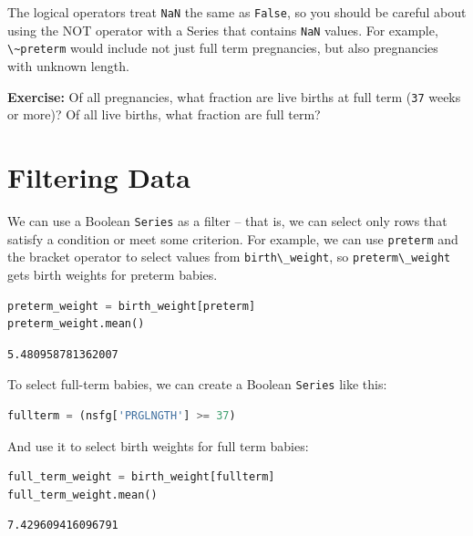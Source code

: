 The logical operators treat \passthrough{\lstinline!NaN!} the same as
\passthrough{\lstinline!False!}, so you should be careful about using
the NOT operator with a Series that contains
\passthrough{\lstinline!NaN!} values. For example,
\passthrough{\lstinline!\~preterm!} would include not just full term
pregnancies, but also pregnancies with unknown length.

\textbf{Exercise:} Of all pregnancies, what fraction are live births at
full term (\passthrough{\lstinline!37!} weeks or more)? Of all live
births, what fraction are full term?

\hypertarget{filtering-data}{%
\section{Filtering Data}\label{filtering-data}}

We can use a Boolean \passthrough{\lstinline!Series!} as a filter --
that is, we can select only rows that satisfy a condition or meet some
criterion. For example, we can use \passthrough{\lstinline!preterm!} and
the bracket operator to select values from
\passthrough{\lstinline!birth\_weight!}, so
\passthrough{\lstinline!preterm\_weight!} gets birth weights for preterm
babies.

\begin{lstlisting}[language=Python,style=source]
preterm_weight = birth_weight[preterm]
preterm_weight.mean()
\end{lstlisting}

\begin{lstlisting}[style=output]
5.480958781362007
\end{lstlisting}

To select full-term babies, we can create a Boolean
\passthrough{\lstinline!Series!} like this:

\begin{lstlisting}[language=Python,style=source]
fullterm = (nsfg['PRGLNGTH'] >= 37)
\end{lstlisting}

And use it to select birth weights for full term babies:

\begin{lstlisting}[language=Python,style=source]
full_term_weight = birth_weight[fullterm]
full_term_weight.mean()
\end{lstlisting}

\begin{lstlisting}[style=output]
7.429609416096791
\end{lstlisting}

